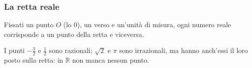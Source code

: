 \documentclass[11pt,a4paper]{article}
\begin{document}
\subsubsection*{La retta reale}

Fissati un punto $O$ (lo $0$), un verso e un'unità di misura, ogni numero
reale corrisponde a un punto della retta e viceversa.

\begin{center}
\end{center}

I punti $-\frac32$ e $\frac12$ sono razionali; $\sqrt{2}$ e $\pi$ sono
irrazionali, ma hanno anch'essi il loro posto sulla retta: in $\mathbb{R}$
non manca nessun punto.
\end{document}
